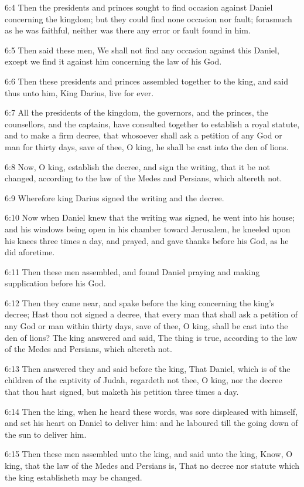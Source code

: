 6:4 Then the presidents and princes sought to find occasion against
Daniel concerning the kingdom; but they could find none occasion nor
fault; forasmuch as he was faithful, neither was there any error or
fault found in him.

6:5 Then said these men, We shall not find any occasion against this
Daniel, except we find it against him concerning the law of his God.

6:6 Then these presidents and princes assembled together to the king,
and said thus unto him, King Darius, live for ever.

6:7 All the presidents of the kingdom, the governors, and the princes,
the counsellors, and the captains, have consulted together to
establish a royal statute, and to make a firm decree, that whosoever
shall ask a petition of any God or man for thirty days, save of thee,
O king, he shall be cast into the den of lions.

6:8 Now, O king, establish the decree, and sign the writing, that it
be not changed, according to the law of the Medes and Persians, which
altereth not.

6:9 Wherefore king Darius signed the writing and the decree.

6:10 Now when Daniel knew that the writing was signed, he went into
his house; and his windows being open in his chamber toward Jerusalem,
he kneeled upon his knees three times a day, and prayed, and gave
thanks before his God, as he did aforetime.

6:11 Then these men assembled, and found Daniel praying and making
supplication before his God.

6:12 Then they came near, and spake before the king concerning the
king's decree; Hast thou not signed a decree, that every man that
shall ask a petition of any God or man within thirty days, save of
thee, O king, shall be cast into the den of lions? The king answered
and said, The thing is true, according to the law of the Medes and
Persians, which altereth not.

6:13 Then answered they and said before the king, That Daniel, which
is of the children of the captivity of Judah, regardeth not thee, O
king, nor the decree that thou hast signed, but maketh his petition
three times a day.

6:14 Then the king, when he heard these words, was sore displeased
with himself, and set his heart on Daniel to deliver him: and he
laboured till the going down of the sun to deliver him.

6:15 Then these men assembled unto the king, and said unto the king,
Know, O king, that the law of the Medes and Persians is, That no
decree nor statute which the king establisheth may be changed.

